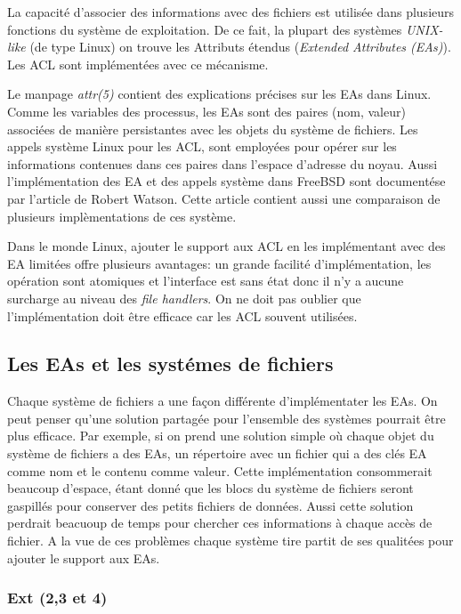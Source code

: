 \documentclass{article}
\begin{document}
La capacité d'associer des informations avec des fichiers est utilisée dans plusieurs fonctions du système de exploitation. De ce fait, la plupart des systèmes \emph{UNIX-like} (de type Linux) on trouve les Attributs étendus (\emph{Extended Attributes (EAs)}). Les ACL sont implémentées avec ce mécanisme.


Le manpage \cite{aclsuse} \emph{attr(5)} contient des explications précises sur les EAs dans Linux. Comme les variables des processus, les EAs sont des paires (nom, valeur) associées de manière persistantes avec les objets du système de fichiers. Les appels système Linux pour les ACL, sont employées pour opérer sur les informations contenues dans ces paires dans l'espace d'adresse du noyau. Aussi l'implémentation des EA et des appels système dans FreeBSD sont documentése par l'article de Robert Watson\cite{trust}. Cette article contient aussi une comparaison de plusieurs implèmentations de ces système.
 
Dans le monde Linux, ajouter le support aux ACL en les implémentant avec des EA limitées offre plusieurs avantages: un grande facilité d'implémentation, les opération sont atomiques et l'interface est sans état donc il n'y a aucune surcharge au niveau des \emph{file handlers}. On ne doit pas oublier que l'implémentation doit être efficace car les ACL souvent utilisées.
 
\subsection{Les EAs et les systémes de fichiers}
 
Chaque système de fichiers a une façon différente d'implémentater les EAs. On peut penser qu'une solution partagée pour l'ensemble des systèmes pourrait être plus efficace. Par exemple, si on prend une solution simple où chaque objet du système de fichiers a des EAs, un répertoire avec un fichier qui a des clés EA comme nom et le contenu comme valeur. Cette implémentation consommerait beaucoup d'espace, étant donné que les blocs du système de fichiers seront gaspillés pour conserver des petits fichiers de données. Aussi cette solution perdrait beacuoup de temps pour chercher ces informations à chaque accès de fichier. A la vue de ces problèmes chaque système tire partit de ses qualitées pour ajouter le support aux EAs.
 
\subsubsection{Ext (2,3 et 4)}
 
\end{document}
